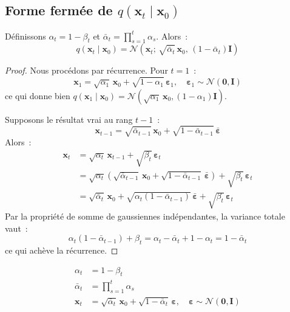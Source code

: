 \subsection{Forme ferm\'ee de $q(\mathbf{x}_t \mid \mathbf{x}_0)$}
\label{sec:closed-form}

\begin{theoreme}
\label{thm:closed-form}
D\'efinissons $\alpha_t = 1 - \beta_t$ et $\bar{\alpha}_t = \prod_{s=1}^{t} \alpha_s$.
Alors~:
\begin{equation}
q(\mathbf{x}_t \mid \mathbf{x}_0) = \mathcal{N}\!\left(\mathbf{x}_t;\, \sqrt{\bar{\alpha}_t}\,\mathbf{x}_0,\, (1 - \bar{\alpha}_t)\mathbf{I}\right)
\label{eq:closed-form}
\end{equation}
\end{theoreme}

\begin{proof}
Nous proc\'edons par r\'ecurrence. Pour $t = 1$~:
\[
\mathbf{x}_1 = \sqrt{\alpha_1}\,\mathbf{x}_0 + \sqrt{1 - \alpha_1}\,\boldsymbol{\varepsilon}_1, \quad \boldsymbol{\varepsilon}_1 \sim \mathcal{N}(\mathbf{0}, \mathbf{I})
\]
ce qui donne bien $q(\mathbf{x}_1 \mid \mathbf{x}_0) = \mathcal{N}(\sqrt{\alpha_1}\,\mathbf{x}_0, (1 - \alpha_1)\mathbf{I})$.

Supposons le r\'esultat vrai au rang $t-1$~:
\[
\mathbf{x}_{t-1} = \sqrt{\bar{\alpha}_{t-1}}\,\mathbf{x}_0 + \sqrt{1 - \bar{\alpha}_{t-1}}\,\bar{\boldsymbol{\varepsilon}}
\]
Alors~:
\begin{align}
\mathbf{x}_t &= \sqrt{\alpha_t}\,\mathbf{x}_{t-1} + \sqrt{\beta_t}\,\boldsymbol{\varepsilon}_t \\
&= \sqrt{\alpha_t}\left(\sqrt{\bar{\alpha}_{t-1}}\,\mathbf{x}_0 + \sqrt{1 - \bar{\alpha}_{t-1}}\,\bar{\boldsymbol{\varepsilon}}\right) + \sqrt{\beta_t}\,\boldsymbol{\varepsilon}_t \\
&= \sqrt{\bar{\alpha}_t}\,\mathbf{x}_0 + \sqrt{\alpha_t(1 - \bar{\alpha}_{t-1})}\,\bar{\boldsymbol{\varepsilon}} + \sqrt{\beta_t}\,\boldsymbol{\varepsilon}_t
\end{align}
Par la propri\'et\'e de somme de gaussiennes ind\'ependantes, la variance
totale vaut~:
\[
\alpha_t(1 - \bar{\alpha}_{t-1}) + \beta_t = \alpha_t - \bar{\alpha}_t + 1 - \alpha_t = 1 - \bar{\alpha}_t
\]
ce qui ach\`eve la r\'ecurrence.
\end{proof}

\begin{formules}[title=\textbf{\'Equations cl\'es du processus direct}]
\begin{align}
\alpha_t &= 1 - \beta_t \\
\bar{\alpha}_t &= \prod_{s=1}^{t} \alpha_s \\
\mathbf{x}_t &= \sqrt{\bar{\alpha}_t}\,\mathbf{x}_0 + \sqrt{1 - \bar{\alpha}_t}\,\boldsymbol{\varepsilon}, \quad \boldsymbol{\varepsilon} \sim \mathcal{N}(\mathbf{0}, \mathbf{I})
\end{align}
\end{formules}

